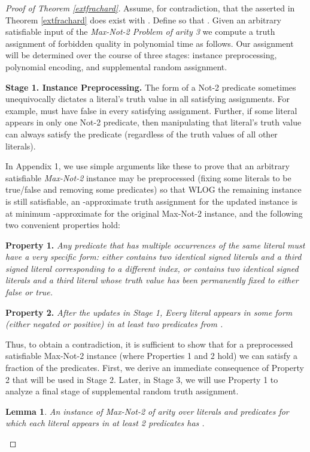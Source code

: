 \documentclass{article}
\newtheorem{lem}[thm]{Lemma}
\begin{document}
\vspace{2mm}
\begin{proof}[Proof of Theorem \ref{extfrachard}] Assume, for  contradiction, that the  asserted in Theorem \ref{extfrachard} does exist with . Define  so that . Given an arbitrary satisfiable input  of the \textit{Max-Not-2 Problem of arity 3} we compute a truth assignment of forbidden quality in polynomial time as follows. Our assignment will be determined over the course of three stages: instance preprocessing, polynomial encoding, and supplemental random assignment.

\vspace{2mm}

\noindent \textbf{Stage 1. Instance Preprocessing.} The form of a Not-2 predicate sometimes unequivocally dictates a literal's truth value in all satisfying assignments. For example,  must have  false in every satisfying assignment. Further, if some literal appears in only one Not-2 predicate, then manipulating that literal's truth value can always satisfy the predicate (regardless of the truth values of all other literals).  

In Appendix 1, we use simple arguments like these to prove that an arbitrary satisfiable \textit{Max-Not-2} instance may be preprocessed (fixing some literals to be true/false and removing some predicates) so that
WLOG the remaining instance is still satisfiable, an -approximate truth assignment for the updated instance is at minimum -approximate for the original Max-Not-2 instance, and the following two convenient properties hold:

\vspace{1mm}

\noindent \textbf{Property 1.} \textit{Any predicate  that has multiple occurrences of the same literal must have a very specific form: either  contains two identical signed literals and a third signed literal corresponding to a different index, or   contains two identical signed literals and a third literal whose truth value has been permanently fixed to either false or true.}
\vspace{1mm}


\noindent \textbf{Property 2.} \textit{After the updates in Stage 1, Every literal  appears in some form (either negated or positive) in at least two predicates from .}

\vspace{1mm}

\noindent 
Thus, to obtain a contradiction, it is sufficient to show that for a preprocessed satisfiable Max-Not-2 instance (where Properties 1 and 2 hold)  we can satisfy a  fraction of the predicates. First, we derive an immediate consequence of Property 2 that will be used in Stage 2. Later, in Stage 3, we will use Property 1 to analyze a final stage of supplemental random truth assignment. 
\begin{lem} \label{twofifths} An instance of \textit{Max-Not-2} of arity  over literals  and predicates  for which each literal appears in at least 2 predicates has .
\end{lem}



\end{proof}
\end{document}
